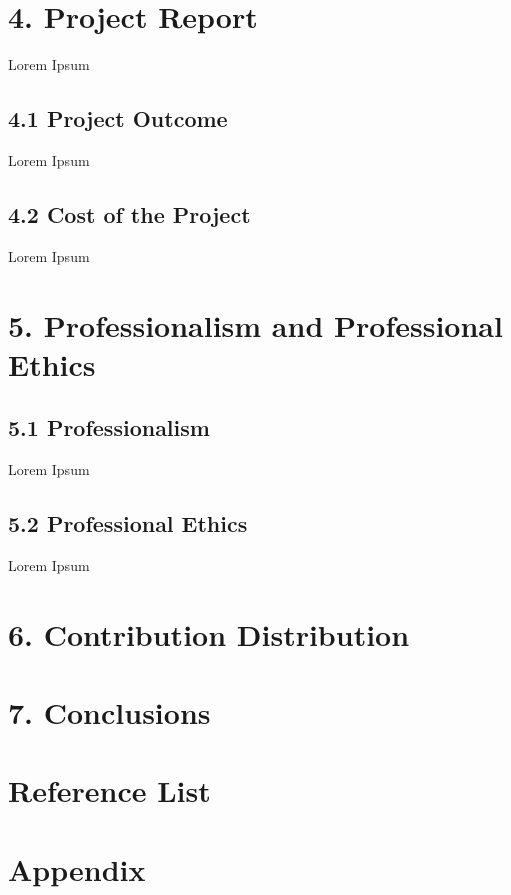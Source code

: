 \documentclass[11pt]{article}
\begin{document}
\section{4. Project Report}
Lorem Ipsum

\subsection{4.1 Project Outcome}
Lorem Ipsum

\subsection{4.2 Cost of the Project}
Lorem Ipsum



\section{5. Professionalism and Professional Ethics}

\subsection{5.1 Professionalism}
Lorem Ipsum

\subsection{5.2 Professional Ethics}
Lorem Ipsum



\section{6. Contribution Distribution}



\section{7. Conclusions}




\section{Reference List}



\section{Appendix}
\end{document}
